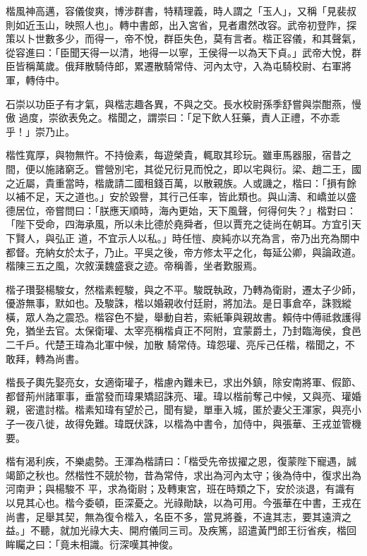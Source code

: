 \begin{pinyinscope}
 楷風神高邁，容儀俊爽，博涉群書，特精理義，時人謂之「玉人」，又稱「見裴叔則如近玉山，映照人也」。轉中書郎，出入宮省，見者肅然改容。武帝初登阼，探策以卜世數多少，而得一，帝不悅，群臣失色，莫有言者。楷正容儀，和其聲氣，從容進曰：「臣聞天得一以清，地得一以寧，王侯得一以為天下貞。」武帝大悅，群臣皆稱萬歲。俄拜散騎侍郎，累遷散騎常侍、河內太守，入為屯騎校尉、右軍將軍，轉侍中。



 石崇以功臣子有才氣，與楷志趣各異，不與之交。長水校尉孫季舒嘗與崇酣燕，慢傲
 過度，崇欲表免之。楷聞之，謂崇曰：「足下飲人狂藥，責人正禮，不亦乖乎！」崇乃止。



 楷性寬厚，與物無忤。不持儉素，每遊榮貴，輒取其珍玩。雖車馬器服，宿昔之間，便以施諸窮乏。嘗營別宅，其從兄衍見而悅之，即以宅與衍。梁、趙二王，國之近屬，貴重當時，楷歲請二國租錢百萬，以散親族。人或譏之，楷曰：「損有餘以補不足，天之道也。」安於毀譽，其行己任率，皆此類也。與山濤、和嶠並以盛德居位，帝嘗問曰：「朕應天順時，海內更始，天下風聲，何得何失？」楷對曰：「陛下受命，四海承風，所以未比德於堯舜者，但以賈充之徒尚在朝耳。方宜引天下賢人，與弘正
 道，不宜示人以私。」時任愷、庾純亦以充為言，帝乃出充為關中都督。充納女於太子，乃止。平吳之後，帝方修太平之化，每延公卿，與論政道。楷陳三五之風，次敘漢魏盛衰之迹。帝稱善，坐者歎服焉。



 楷子瓚娶楊駿女，然楷素輕駿，與之不平。駿既執政，乃轉為衛尉，遷太子少師，優游無事，默如也。及駿誅，楷以婚親收付廷尉，將加法。是日事倉卒，誅戮縱橫，眾人為之震恐。楷容色不變，舉動自若，索紙筆與親故書。賴侍中傅祗救護得免，猶坐去官。太保衛瓘、太宰亮稱楷貞正不阿附，宜蒙爵土，乃封臨海侯，食邑二千戶。代楚王瑋為北軍中候，加散
 騎常侍。瑋怨瓘、亮斥己任楷，楷聞之，不敢拜，轉為尚書。



 楷長子輿先娶亮女，女適衛瓘子，楷慮內難未已，求出外鎮，除安南將軍、假節、都督荊州諸軍事，垂當發而瑋果矯詔誅亮、瓘。瑋以楷前奪己中候，又與亮、瓘婚親，密遣討楷。楷素知瑋有望於己，聞有變，單車入城，匿於妻父王渾家，與亮小子一夜八徙，故得免難。瑋既伏誅，以楷為中書令，加侍中，與張華、王戎並管機要。



 楷有渴利疾，不樂處勢。王渾為楷請曰：「楷受先帝拔擢之恩，復蒙陛下寵遇，誠竭節之秋也。然楷性不競於物，昔為常侍，求出為河內太守；後為侍中，復求出為河南尹；與楊駿不
 平，求為衛尉；及轉東宮，班在時類之下，安於淡退，有識有以見其心也。楷今委頓，臣深憂之。光祿勛缺，以為可用。今張華在中書，王戎在尚書，足舉其契，無為復令楷入，名臣不多，當見將養，不違其志，要其遠濟之益。」不聽，就加光祿大夫、開府儀同三司。及疾篤，詔遣黃門郎王衍省疾，楷回眸矚之曰：「竟未相識。衍深嘆其神俊。




\end{pinyinscope}
